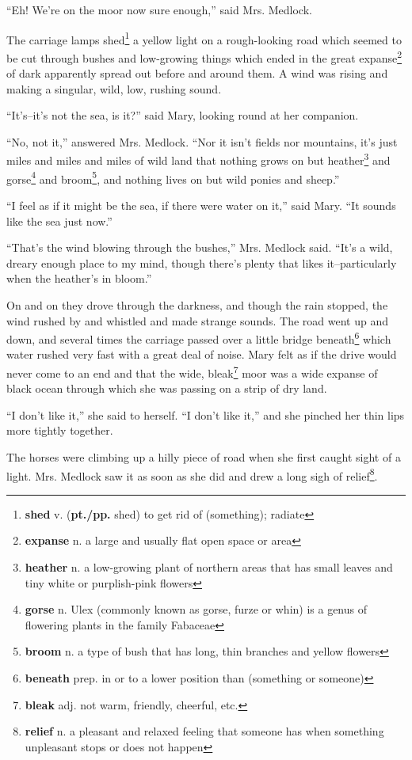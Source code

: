 ``Eh! We're on the moor now sure enough,'' said Mrs. Medlock.

The carriage lamps shed\footnote{\textbf{shed} v. (\textbf{pt./pp.} shed) to get rid of (something); radiate} a yellow light on a rough-looking road which seemed to be cut through bushes and low-growing things which ended in the great expanse\footnote{\textbf{expanse} n. a large and usually flat open space or area} of dark apparently spread out before and around them. A wind was rising and making a singular, wild, low, rushing sound.

``It's--it's not the sea, is it?'' said Mary, looking round at her companion.

``No, not it,'' answered Mrs. Medlock. ``Nor it isn't fields nor mountains, it's just miles and miles and miles of wild land that nothing grows on but heather\footnote{\textbf{heather} n. a low-growing plant of northern areas that has small leaves and tiny white or purplish-pink flowers} and gorse\footnote{\textbf{gorse} n. Ulex (commonly known as gorse, furze or whin) is a genus of flowering plants in the family Fabaceae} and broom\footnote{\textbf{broom} n. a type of bush that has long, thin branches and yellow flowers}, and nothing lives on but wild ponies and sheep.''

``I feel as if it might be the sea, if there were water on it,'' said Mary. ``It sounds like the sea just now.''

``That's the wind blowing through the bushes,'' Mrs. Medlock said. ``It's a wild, dreary enough place to my mind, though there's plenty that likes it--particularly when the heather's in bloom.''

On and on they drove through the darkness, and though the rain stopped, the wind rushed by and whistled and made strange sounds. The road went up and down, and several times the carriage passed over a little bridge beneath\footnote{\textbf{beneath} prep. in or to a lower position than (something or someone)} which water rushed very fast with a great deal of noise. Mary felt as if the drive would never come to an end and that the wide, bleak\footnote{\textbf{bleak} adj. not warm, friendly, cheerful, etc.} moor was a wide expanse of black ocean through which she was passing on a strip of dry land.

``I don't like it,'' she said to herself. ``I don't like it,'' and she pinched her thin lips more tightly together.

The horses were climbing up a hilly piece of road when she first caught sight of a light. Mrs. Medlock saw it as soon as she did and drew a long sigh of relief\footnote{\textbf{relief} n. a pleasant and relaxed feeling that someone has when something unpleasant stops or does not happen}.

